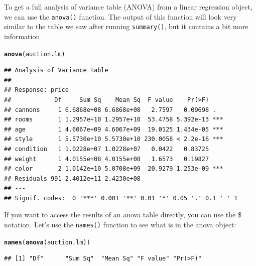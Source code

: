 \documentclass{tufte-book}\usepackage[]{graphicx}\usepackage[]{color}
\makeatletter
\newcommand{\hlstd}[1]{\textcolor[rgb]{0.345,0.345,0.345}{#1}}%
\newcommand{\hlkwd}[1]{\textcolor[rgb]{0.737,0.353,0.396}{\textbf{#1}}}%
\newenvironment{kframe}{%
 \def\at@end@of@kframe{}%
 \ifinner\ifhmode%
  \def\at@end@of@kframe{\end{minipage}}%
  \begin{minipage}{\columnwidth}%
 \fi\fi%
 \def\FrameCommand##1{\hskip\@totalleftmargin \hskip-\fboxsep
 \colorbox{shadecolor}{##1}\hskip-\fboxsep
     \hskip-\linewidth \hskip-\@totalleftmargin \hskip\columnwidth}%
 \MakeFramed {\advance\hsize-\width
   \@totalleftmargin\z@ \linewidth\hsize
   \@setminipage}}%
 {\par\unskip\endMakeFramed%
 \at@end@of@kframe}
\newenvironment{knitrout}{}{} %
\makeatother
\begin{document}
\begin{footnotesize}
\begin{marginfigure}
\begin{knitrout}
\end{knitrout}
\end{marginfigure}

To get a full analysis of variance table (ANOVA) from a linear regression object, we can use the \texttt{anova()} function. The output of this function will look very similar to the table we saw after running \texttt{summary()}, but it contains a bit more information

\begin{knitrout}
\color{fgcolor}\begin{kframe}
\begin{alltt}
\hlkwd{anova}\hlstd{(auction.lm)}
\end{alltt}
\begin{verbatim}
## Analysis of Variance Table
## 
## Response: price
##            Df     Sum Sq    Mean Sq  F value    Pr(>F)    
## cannons     1 6.6868e+08 6.6868e+08   2.7597   0.09698 .  
## rooms       1 1.2957e+10 1.2957e+10  53.4758 5.392e-13 ***
## age         1 4.6067e+09 4.6067e+09  19.0125 1.434e-05 ***
## style       1 5.5730e+10 5.5730e+10 230.0058 < 2.2e-16 ***
## condition   1 1.0228e+07 1.0228e+07   0.0422   0.83725    
## weight      1 4.0155e+08 4.0155e+08   1.6573   0.19827    
## color       2 1.0142e+10 5.0708e+09  20.9279 1.253e-09 ***
## Residuals 991 2.4012e+11 2.4230e+08                       
## ---
## Signif. codes:  0 '***' 0.001 '**' 0.01 '*' 0.05 '.' 0.1 ' ' 1
\end{verbatim}
\end{kframe}
\end{knitrout}

If you want to access the results of an anova table directly, you can use the \$ notation. Let's use the \texttt{names()} function to see what is in the anova object:

\begin{footnotesize}
\begin{knitrout}
\color{fgcolor}\begin{kframe}
\begin{alltt}
\hlkwd{names}\hlstd{(}\hlkwd{anova}\hlstd{(auction.lm))}
\end{alltt}
\begin{verbatim}
## [1] "Df"      "Sum Sq"  "Mean Sq" "F value" "Pr(>F)"
\end{verbatim}
\end{kframe}
\end{knitrout}
\end{footnotesize}



\end{footnotesize}
\end{document}
